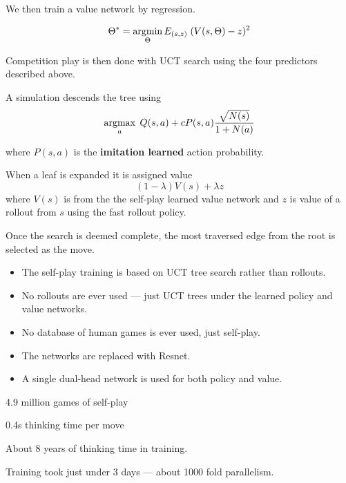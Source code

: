 {\vfill
We then train a value network by regression.

\vfill
$$\Theta^* = \operatorname*{argmin}_\Theta E_{(s,z)}\;(V(s,\Theta) - z)^2$$


Competition play is then done with UCT search using the four predictors described above.

\vfill
A simulation descends the tree using
$$\operatorname*{argmax}_a \;Q(s,a) + c P(s,a)\frac{\sqrt{N(s)}}{1+N(a)}$$

\vfill
where $P(s,a)$ is the {\bf imitation learned} action probability.


\vfill
When a leaf is expanded it is assigned value
$$(1-\lambda)V(s) + \lambda z$$
where $V(s)$ is from the the self-play learned value network and $z$ is value of a rollout from $s$ using the fast rollout policy.

\vfill
Once the search is deemed complete, the most traversed edge from the root is selected as the move.


\begin{itemize}
\item The self-play training is based on UCT tree search rather than rollouts.

  \vfill
\item No rollouts are ever used --- just UCT trees under the learned policy and value networks.

  \vfill
\item No database of human games is ever used, just self-play.

  \vfill
\item The networks are replaced with Resnet.

  \vfill
\item A single dual-head network is used for both policy and value.
\end{itemize}



4.9 million games of self-play

\vfill
0.4s thinking time per move

\vfill
About 8 years of thinking time in training.

\vfill
Training took just under 3 days --- about 1000 fold parallelism.


}
